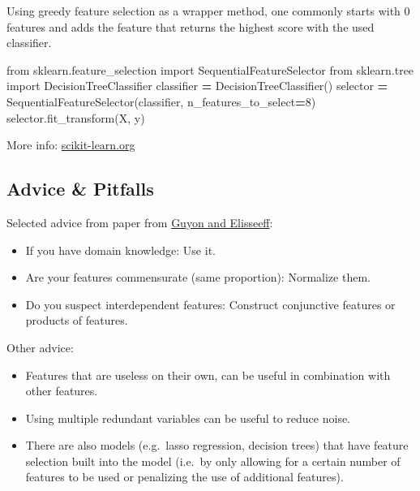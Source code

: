 \documentclass[
]{book}
\newenvironment{Shaded}{\begin{snugshade}}{\end{snugshade}}
\newcommand{\DecValTok}[1]{\textcolor[rgb]{0.00,0.00,0.81}{#1}}
\newcommand{\ImportTok}[1]{#1}
\newcommand{\NormalTok}[1]{#1}
\newcommand{\OperatorTok}[1]{\textcolor[rgb]{0.81,0.36,0.00}{\textbf{#1}}}
\begin{document}
Using greedy feature selection as a wrapper method, one commonly starts
with 0 features and adds the feature that returns the highest score with
the used classifier.

\begin{Shaded}
\begin{Highlighting}[]
\ImportTok{from}\NormalTok{ sklearn.feature\_selection }\ImportTok{import}\NormalTok{ SequentialFeatureSelector}
\ImportTok{from}\NormalTok{ sklearn.tree }\ImportTok{import}\NormalTok{ DecisionTreeClassifier}
\NormalTok{classifier }\OperatorTok{=}\NormalTok{ DecisionTreeClassifier()}
\NormalTok{selector }\OperatorTok{=}\NormalTok{ SequentialFeatureSelector(classifier, n\_features\_to\_select}\OperatorTok{=}\DecValTok{8}\NormalTok{)}
\NormalTok{selector.fit\_transform(X, y)}
\end{Highlighting}
\end{Shaded}

More info:
\href{https://scikit-learn.org/stable/modules/generated/sklearn.feature_selection.SequentialFeatureSelector.html}{scikit-learn.org}

\hypertarget{advice-pitfalls}{%
\subsection{Advice \& Pitfalls}\label{advice-pitfalls}}

Selected advice from paper from \href{https://jmlr.csail.mit.edu/papers/volume3/guyon03a/guyon03a.pdf}{Guyon and
Elisseeff}:

\begin{itemize}
\item
  If you have domain knowledge: Use it.
\item
  Are your features commensurate (same proportion): Normalize them.
\item
  Do you suspect interdependent features: Construct conjunctive
  features or products of features.
\end{itemize}

Other advice:

\begin{itemize}
\item
  Features that are useless on their own, can be useful in combination
  with other features.
\item
  Using multiple redundant variables can be useful to reduce noise.
\item
  There are also models (e.g.~lasso regression, decision trees) that
  have feature selection built into the model (i.e.~by only allowing
  for a certain number of features to be used or penalizing the use of
  additional features).
\end{itemize}
\end{document}
